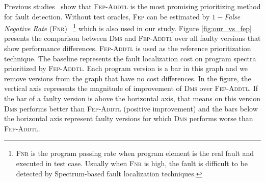 \vspace{0.2cm}
Previous studies~\citep{RUCH01,SEAGMGR01} show that \textsc{Fep-Addtl} is the most
promising prioritizing method for fault detection.
Without test oracles, \textsc{Fep} can be estimated by $1 - ${\em False Negative Rate} (\textsc{Fnr})~\citep{Gonzalez-SanchezPAGG11}
\footnote{\textsc{Fnr} is the program passing rate when program element is the real fault and executed in test case. Usually when
\textsc{Fnr} is high, the fault is difficult to be detected by Spectrum-based
fault localization techniques.} which is also used in our study.
Figure \ref{fig:our_vs_fep} presents the comparison
between \textsc{Dms} and \textsc{Fep-Addtl} over all faulty versions that show performance differences.
\textsc{Fep-Addtl} is used as the reference prioritization technique.
The baseline represents the fault localization cost on program spectra prioritized
by \textsc{Fep-Addtl}. Each program version is a bar in this graph and we remove
versions from the graph that have no cost differences.
In the figure, the vertical axis represents the magnitude of
improvement of \textsc{Dms} over \textsc{Fep-Addtl}.
If the bar of a faulty version is above the
horizontal axis, that means on this version \textsc{Dms} performs
better than \textsc{Fep-Addtl} (positive improvement) and the bars
below the horizontal axis represent faulty versions for which
\textsc{Dms} performs worse than \textsc{Fep-Addtl}.

